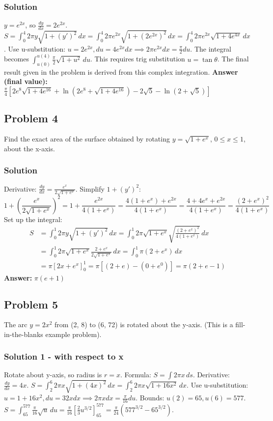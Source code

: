 \documentclass{article}
\begin{document}
\subsubsection*{Solution}
$y = e^{2x}$, so $ \frac{dy}{dx} = 2e^{2x} $.
$ S = \int_0^4 2\pi y \sqrt{1+(y')^2} \,dx = \int_0^4 2\pi e^{2x} \sqrt{1+(2e^{2x})^2} \,dx = \int_0^4 2\pi e^{2x} \sqrt{1+4e^{4x}} \,dx $.
Use u-substitution: $ u = 2e^{2x}, du = 4e^{2x} dx \implies 2\pi e^{2x} dx = \frac{\pi}{2} du$.
The integral becomes $ \int_{u(0)}^{u(4)} \frac{\pi}{2} \sqrt{1+u^2} \,du $. This requires trig substitution $u=\tan\theta$.
The final result given in the problem is derived from this complex integration.
\textbf{Answer (final value):} $ \frac{\pi}{4} [2e^8\sqrt{1+4e^{16}} + \ln(2e^8 + \sqrt{1+4e^{16}}) - 2\sqrt{5} - \ln(2+\sqrt{5})] $

\subsection{Problem 4}
Find the exact area of the surface obtained by rotating $y = \sqrt{1+e^x}$, $0 \le x \le 1$, about the x-axis.
\subsubsection*{Solution}
Derivative: $ \frac{dy}{dx} = \frac{e^x}{2\sqrt{1+e^x}} $.
Simplify $1+(y')^2$:
\[ 1 + \left(\frac{e^x}{2\sqrt{1+e^x}}\right)^2 = 1 + \frac{e^{2x}}{4(1+e^x)} = \frac{4(1+e^x)+e^{2x}}{4(1+e^x)} = \frac{4+4e^x+e^{2x}}{4(1+e^x)} = \frac{(2+e^x)^2}{4(1+e^x)} \]
Set up the integral:
\begin{align*}
    S &= \int_0^1 2\pi y \sqrt{1+(y')^2} \,dx = \int_0^1 2\pi \sqrt{1+e^x} \sqrt{\frac{(2+e^x)^2}{4(1+e^x)}} \,dx \\
    &= \int_0^1 2\pi \sqrt{1+e^x} \frac{2+e^x}{2\sqrt{1+e^x}} \,dx = \int_0^1 \pi (2+e^x) \,dx \\
    &= \pi [2x + e^x]_0^1 = \pi[(2+e) - (0+e^0)] = \pi(2+e-1)
\end{align*}
\textbf{Answer:} $ \pi(e+1) $

\subsection{Problem 5}
The arc $y=2x^2$ from (2, 8) to (6, 72) is rotated about the y-axis. (This is a fill-in-the-blanks example problem).
\subsubsection*{Solution 1 - with respect to x}
Rotate about y-axis, so radius is $r=x$. Formula: $S = \int 2\pi x \,ds$.
Derivative: $ \frac{dy}{dx} = 4x $.
$ S = \int_2^6 2\pi x \sqrt{1+(4x)^2} \,dx = \int_2^6 2\pi x \sqrt{1+16x^2} \,dx $.
Use u-substitution: $ u=1+16x^2, du=32x dx \implies 2\pi x dx = \frac{\pi}{16} du$.
Bounds: $u(2)=65, u(6)=577$.
$ S = \int_{65}^{577} \frac{\pi}{16} \sqrt{u} \,du = \frac{\pi}{16} [\frac{2}{3}u^{3/2}]_{65}^{577} = \frac{\pi}{24}(577^{3/2} - 65^{3/2}) $.
\end{document}
